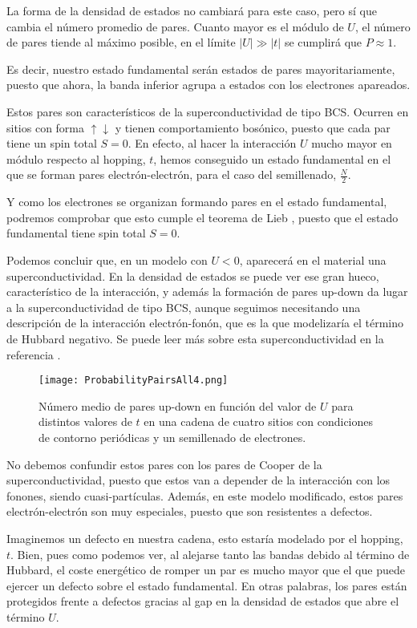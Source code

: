 \documentclass[12pt,twoside]{article}
\begin{document}
La forma de la densidad de estados no cambiará para este caso, pero sí que cambia el número promedio de pares. Cuanto mayor es el módulo de $U$, el número de pares tiende al máximo posible, en el límite $|U| \gg |t|$ se cumplirá que $P \approx 1$.

Es decir, nuestro estado fundamental serán estados de pares mayoritariamente, puesto que ahora, la banda inferior agrupa a estados con los electrones apareados.

Estos pares son característicos de la superconductividad de tipo BCS. Ocurren en sitios con forma $\uparrow\downarrow$ y tienen comportamiento bosónico, puesto que cada par tiene un spin total $S = 0$. En efecto, al hacer la interacción $U$ mucho mayor en módulo respecto al hopping, $t$, hemos conseguido un estado fundamental en el que se forman pares electrón-electrón, para el caso del semillenado, $\frac{N}{2}$.

Y como los electrones se organizan formando pares en el estado fundamental, podremos comprobar que esto cumple el teorema de Lieb \cite{MielkeHubbard}, puesto que el estado fundamental tiene spin total $S = 0$.

Podemos concluir que, en un modelo con $U < 0$, aparecerá en el material una superconductividad. En la densidad de estados se puede ver ese gran hueco, característico de la interacción, y además la formación de pares up-down da lugar a la superconductividad de tipo BCS, aunque seguimos necesitando una descripción de la interacción electrón-fonón, que es la que modelizaría el término de Hubbard negativo. Se puede leer más sobre esta superconductividad en la referencia \cite{Russenschuck:503603}.
\begin{figure}[h!]
  \begin{center}
    \texttt{[image: ProbabilityPairsAll4.png]}
  \end{center}
  \caption{Número medio de pares up-down en función del valor de $U$ para distintos valores de $t$ en una cadena de cuatro sitios con condiciones de contorno periódicas y un semillenado de electrones.}
\end{figure}

No debemos confundir estos pares con los pares de Cooper de la superconductividad, puesto que estos van a depender de la interacción con los fonones, siendo cuasi-partículas. Además, en este modelo modificado, estos pares electrón-electrón son muy especiales, puesto que son resistentes a defectos.

Imaginemos un defecto en nuestra cadena, esto estaría modelado por el hopping, $t$. Bien, pues como podemos ver, al alejarse tanto las bandas debido al término de Hubbard, el coste energético de romper un par es mucho mayor que el que puede ejercer un defecto sobre el estado fundamental. En otras palabras, los pares están protegidos frente a defectos gracias al gap en la densidad de estados que abre el término $U$.
\end{document}
